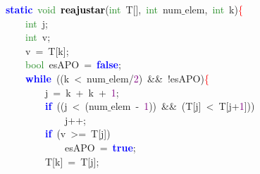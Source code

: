 \mbox{}\textbf{\textcolor{Blue}{static}}\ \textcolor{ForestGreen}{void}\ \textbf{\textcolor{Black}{reajustar}}\textcolor{BrickRed}{(}\textcolor{ForestGreen}{int}\ T\textcolor{BrickRed}{[],}\ \textcolor{ForestGreen}{int}\ num$\_$elem\textcolor{BrickRed}{,}\ \textcolor{ForestGreen}{int}\ k\textcolor{BrickRed}{)}\textcolor{Red}{\{} \\
\mbox{}\ \ \ \ \textcolor{ForestGreen}{int}\ j\textcolor{BrickRed}{;} \\
\mbox{}\ \ \ \ \textcolor{ForestGreen}{int}\ v\textcolor{BrickRed}{;} \\
\mbox{}\ \ \ \ v\ \textcolor{BrickRed}{=}\ T\textcolor{BrickRed}{[}k\textcolor{BrickRed}{];} \\
\mbox{}\ \ \ \ \textcolor{ForestGreen}{bool}\ esAPO\ \textcolor{BrickRed}{=}\ \textbf{\textcolor{Blue}{false}}\textcolor{BrickRed}{;} \\
\mbox{}\ \ \ \ \textbf{\textcolor{Blue}{while}}\ \textcolor{BrickRed}{((}k\ \textcolor{BrickRed}{\textless{}}\ num$\_$elem\textcolor{BrickRed}{/}\textcolor{Purple}{2}\textcolor{BrickRed}{)}\ \textcolor{BrickRed}{\&\&}\ \textcolor{BrickRed}{!}esAPO\textcolor{BrickRed}{)}\textcolor{Red}{\{} \\
\mbox{}\ \ \ \ \ \ \ \ j\ \textcolor{BrickRed}{=}\ k\ \textcolor{BrickRed}{+}\ k\ \textcolor{BrickRed}{+}\ \textcolor{Purple}{1}\textcolor{BrickRed}{;} \\
\mbox{}\ \ \ \ \ \ \ \ \textbf{\textcolor{Blue}{if}}\ \textcolor{BrickRed}{((}j\ \textcolor{BrickRed}{\textless{}}\ \textcolor{BrickRed}{(}num$\_$elem\ \textcolor{BrickRed}{-}\ \textcolor{Purple}{1}\textcolor{BrickRed}{))}\ \textcolor{BrickRed}{\&\&}\ \textcolor{BrickRed}{(}T\textcolor{BrickRed}{[}j\textcolor{BrickRed}{]}\ \textcolor{BrickRed}{\textless{}}\ T\textcolor{BrickRed}{[}j\textcolor{BrickRed}{+}\textcolor{Purple}{1}\textcolor{BrickRed}{]))} \\
\mbox{}\ \ \ \ \ \ \ \ \ \ \ \ j\textcolor{BrickRed}{++;} \\
\mbox{}\ \ \ \ \ \ \ \ \textbf{\textcolor{Blue}{if}}\ \textcolor{BrickRed}{(}v\ \textcolor{BrickRed}{\textgreater{}=}\ T\textcolor{BrickRed}{[}j\textcolor{BrickRed}{])} \\
\mbox{}\ \ \ \ \ \ \ \ \ \ \ \ esAPO\ \textcolor{BrickRed}{=}\ \textbf{\textcolor{Blue}{true}}\textcolor{BrickRed}{;} \\
\mbox{}\ \ \ \ \ \ \ \ T\textcolor{BrickRed}{[}k\textcolor{BrickRed}{]}\ \textcolor{BrickRed}{=}\ T\textcolor{BrickRed}{[}j\textcolor{BrickRed}{];} \\
